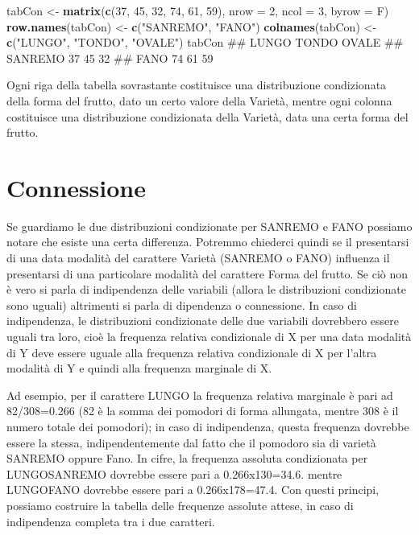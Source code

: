 \documentclass[a4paper,12pt,oneside]{book}
\newenvironment{Shaded}{\begin{snugshade}}{\end{snugshade}}
\newcommand{\KeywordTok}[1]{\textcolor[rgb]{0.13,0.29,0.53}{\textbf{#1}}}
\newcommand{\DataTypeTok}[1]{\textcolor[rgb]{0.13,0.29,0.53}{#1}}
\newcommand{\DecValTok}[1]{\textcolor[rgb]{0.00,0.00,0.81}{#1}}
\newcommand{\StringTok}[1]{\textcolor[rgb]{0.31,0.60,0.02}{#1}}
\newcommand{\NormalTok}[1]{#1}
\theoremstyle{definition}
\theoremstyle{definition}
\theoremstyle{definition}
\theoremstyle{remark}
\begin{document}
\begin{Shaded}
\begin{Highlighting}[]
\NormalTok{tabCon <-}\StringTok{ }\KeywordTok{matrix}\NormalTok{(}\KeywordTok{c}\NormalTok{(}\DecValTok{37}\NormalTok{, }\DecValTok{45}\NormalTok{, }\DecValTok{32}\NormalTok{, }\DecValTok{74}\NormalTok{, }\DecValTok{61}\NormalTok{, }\DecValTok{59}\NormalTok{), }\DataTypeTok{nrow =} \DecValTok{2}\NormalTok{, }\DataTypeTok{ncol =} \DecValTok{3}\NormalTok{,}
                 \DataTypeTok{byrow =}\NormalTok{ F)}
\KeywordTok{row.names}\NormalTok{(tabCon) <-}\StringTok{ }\KeywordTok{c}\NormalTok{(}\StringTok{"SANREMO"}\NormalTok{, }\StringTok{"FANO"}\NormalTok{)}
\KeywordTok{colnames}\NormalTok{(tabCon) <-}\StringTok{ }\KeywordTok{c}\NormalTok{(}\StringTok{"LUNGO"}\NormalTok{, }\StringTok{"TONDO"}\NormalTok{, }\StringTok{"OVALE"}\NormalTok{)}
\NormalTok{tabCon}
\NormalTok{##         LUNGO TONDO OVALE}
\NormalTok{## SANREMO    37    45    32}
\NormalTok{## FANO       74    61    59}
\end{Highlighting}
\end{Shaded}

Ogni riga della tabella sovrastante costituisce una distribuzione
condizionata della forma del frutto, dato un certo valore della Varietà,
mentre ogni colonna costituisce una distribuzione condizionata della
Varietà, data una certa forma del frutto.

\section*{Connessione}\label{connessione}

Se guardiamo le due distribuzioni condizionate per SANREMO e FANO
possiamo notare che esiste una certa differenza. Potremmo chiederci
quindi se il presentarsi di una data modalità del carattere Varietà
(SANREMO o FANO) influenza il presentarsi di una particolare modalità
del carattere Forma del frutto. Se ciò non è vero si parla di
indipendenza delle variabili (allora le distribuzioni condizionate sono
uguali) altrimenti si parla di dipendenza o connessione. In caso di
indipendenza, le distribuzioni condizionate delle due variabili
dovrebbero essere uguali tra loro, cioè la frequenza relativa
condizionale di X per una data modalità di Y deve essere uguale alla
frequenza relativa condizionale di X per l'altra modalità di Y e quindi
alla frequenza marginale di X.

Ad esempio, per il carattere LUNGO la frequenza relativa marginale è
pari ad 82/308=0.266 (82 è la somma dei pomodori di forma allungata,
mentre 308 è il numero totale dei pomodori); in caso di indipendenza,
questa frequenza dovrebbe essere la stessa, indipendentemente dal fatto
che il pomodoro sia di varietà SANREMO oppure Fano. In cifre, la
frequenza assoluta condizionata per LUNGO\textbar{}SANREMO dovrebbe
essere pari a 0.266x130=34.6. mentre LUNGO\textbar{}FANO dovrebbe essere
pari a 0.266x178=47.4. Con questi principi, possiamo costruire la
tabella delle frequenze assolute attese, in caso di indipendenza
completa tra i due caratteri.
\end{document}
